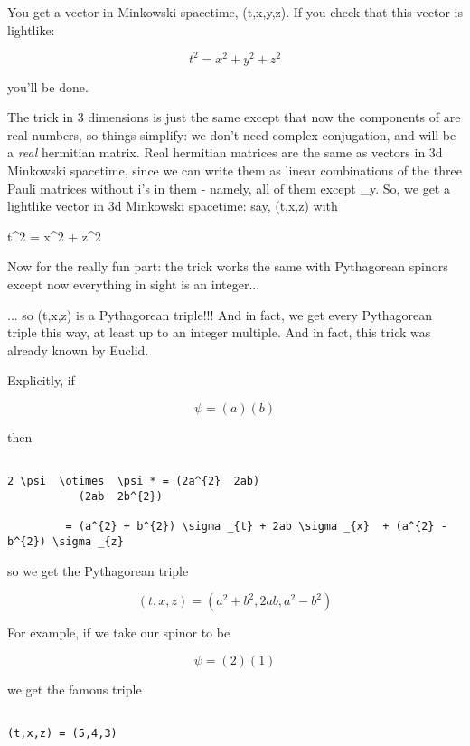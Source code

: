 You get a vector in Minkowski spacetime, (t,x,y,z).   
If you check that this vector is lightlike:


$$

t^{2} = x^{2} + y^{2} + z^{2} 
$$
    
you'll be done.

The trick in 3 dimensions is just the same except that now
the components of \psi  are real numbers, so things simplify:
we don't need complex conjugation, and \psi  \otimes  \psi * 
will be a \emph{real} hermitian matrix.  Real hermitian matrices
are the same as vectors in 3d Minkowski spacetime, since we 
can write them as linear combinations of the three Pauli 
matrices without i's in them - namely, all of them except
\sigma _{y}.  So, we get a lightlike vector in 3d Minkowski 
spacetime: say, (t,x,z) with 

t^{2} = x^{2} + z^{2} 

Now for the really fun part: the trick works the same with 
Pythagorean spinors except now everything in sight is an integer... 

... so (t,x,z) is a Pythagorean triple!!!   And in fact,
we get every Pythagorean triple this way, at least up to
an integer multiple.  And in fact, this trick was already 
known by Euclid.  

Explicitly, if 


$$

\psi  = (a)
    (b)
$$
    
then 


\begin{verbatim}

2 \psi  \otimes  \psi * = (2a^{2}  2ab) 
           (2ab  2b^{2})                  

         = (a^{2} + b^{2}) \sigma _{t} + 2ab \sigma _{x}  + (a^{2} - b^{2}) \sigma _{z}
\end{verbatim}
    
so we get the Pythagorean triple


$$

(t,x,z) = (a^{2} + b^{2}, 2ab, a^{2} - b^{2})
$$
    
For example, if we take our spinor to be


$$

\psi  = (2)
    (1)
$$
    
we get the famous triple 


\begin{verbatim}

(t,x,z) = (5,4,3)  
\end{verbatim}
    

